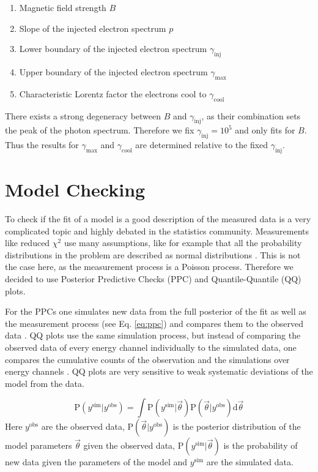 \documentclass[twocolumn]{aa}
\begin{document}
\begin{enumerate}
	\item Magnetic field strength $B$
  \item Slope of the injected electron spectrum $p$
  \item Lower boundary of the injected electron spectrum $\gamma_{\mathrm{inj}}$
  \item Upper boundary of the injected electron spectrum $\gamma_{\mathrm{max}}$
  \item Characteristic Lorentz factor the electrons cool to $\gamma_{\mathrm{cool}}$
\end{enumerate}

There exists a strong degeneracy between $B$ and $\gamma_{\mathrm{inj}}$, as their combination sets the peak of the photon spectrum. Therefore we fix $\gamma_{\mathrm{inj}}=10^{5}$ and only fits for $B$. Thus the results for $\gamma_{\mathrm{max}}$ and $\gamma_{\mathrm{cool}}$ are determined relative to the fixed $\gamma_{\mathrm{inj}}$.

\section{Model Checking}
\label{PPC}
To check if the fit of a model is a good description of the measured data is a very complicated topic and highly debated in the statistics community. Measurements like reduced $\chi^{2}$ use many assumptions, like for example that all the probability distributions in the problem are described as normal distributions \citep{dosanddonts}. This is not the case here, as the measurement process is a Poisson process. Therefore we decided to use Posterior Predictive Checks (PPC) and Quantile-Quantile (QQ) plots.

For the PPCs one simulates new data from the full posterior of the fit as well as the measurement process (see Eq. \ref{eq:ppc}) and compares them to the observed data \citep{ppc}. QQ plots use the same simulation process, but instead of comparing the observed data of every energy channel individually to the simulated data, one compares the cumulative counts of the observation and the simulations over energy channels  \citep{QQ}. QQ plots are very sensitive to weak systematic deviations of the model from the data.

\begin{equation}
  \textrm{P}(y^{\textrm{sim}}|y^{\textrm{obs}}) = \int \textrm{P}(y^{\textrm{sim}}|\vec{\theta}) \textrm{P}(\vec{\theta}|y^{\textrm{obs}}) \mathrm{d}\vec{\theta}
  \label{eq:ppc}
\end{equation}
\noindent
Here $y^{\textrm{obs}}$ are the observed data, $\textrm{P}(\vec{\theta}|y^{\textrm{obs}})$ is the posterior distribution of the model parameters $\vec{\theta}$ given the observed data, $\textrm{P}(y^{\textrm{sim}}|\vec{\theta})$ is the probability of new data given the parameters of the model and $y^{\textrm{sim}}$ are the simulated data.
\end{document}
